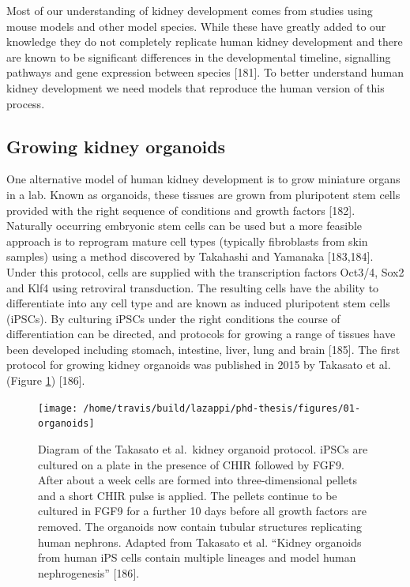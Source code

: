\documentclass[11pt,a4paper,titlepage,twoside,openright]{style/unimelbthesis}
\theoremstyle{definition}
\theoremstyle{definition}
\theoremstyle{definition}
\theoremstyle{remark}
\begin{document}
\begin{mainmatter}
Most of our understanding of kidney development comes from studies using mouse models and other model species. While these have greatly added to our knowledge they do not completely replicate human kidney development and there are known to be significant differences in the developmental timeline, signalling pathways and gene expression between species {[}181{]}. To better understand human kidney development we need models that reproduce the human version of this process.

\hypertarget{growing-kidney-organoids}{%
\subsection{Growing kidney organoids}\label{growing-kidney-organoids}}

One alternative model of human kidney development is to grow miniature organs in a lab. Known as organoids, these tissues are grown from pluripotent stem cells provided with the right sequence of conditions and growth factors {[}182{]}. Naturally occurring embryonic stem cells can be used but a more feasible approach is to reprogram mature cell types (typically fibroblasts from skin samples) using a method discovered by Takahashi and Yamanaka {[}183,184{]}. Under this protocol, cells are supplied with the transcription factors Oct3/4, Sox2 and Klf4 using retroviral transduction. The resulting cells have the ability to differentiate into any cell type and are known as induced pluripotent stem cells (iPSCs). By culturing iPSCs under the right conditions the course of differentiation can be directed, and protocols for growing a range of tissues have been developed including stomach, intestine, liver, lung and brain {[}185{]}. The first protocol for growing kidney organoids was published in 2015 by Takasato et al. (Figure \ref{fig:organoids}) {[}186{]}.

\begin{figure}

{\centering \texttt{[image: /home/travis/build/lazappi/phd-thesis/figures/01-organoids]} 

}

\caption[Diagram of the Takasato et al.~kidney organoid protocol.]{Diagram of the Takasato et al.~kidney organoid protocol. iPSCs are cultured on a plate in the presence of CHIR followed by FGF9. After about a week cells are formed into three-dimensional pellets and a short CHIR pulse is applied. The pellets continue to be cultured in FGF9 for a further 10 days before all growth factors are removed. The organoids now contain tubular structures replicating human nephrons. Adapted from Takasato et al. \enquote{Kidney organoids from human iPS cells contain multiple lineages and model human nephrogenesis} {[}186{]}.}\label{fig:organoids}
\end{figure}






\end{mainmatter}
\end{document}
